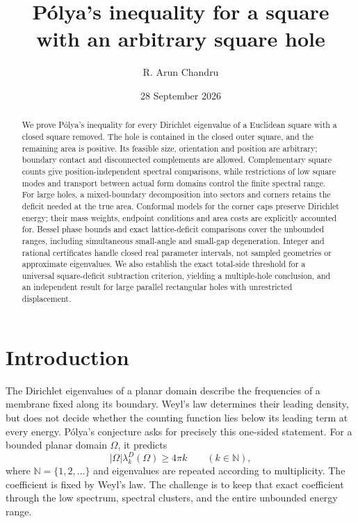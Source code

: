 \documentclass[11pt,reqno]{amsart}
\title[P\'olya's inequality for square holes]{P\'olya's inequality for a square\texorpdfstring{\\}{ }with an arbitrary square hole}
\author{R. Arun Chandru}
\date{28 September 2026}
\numberwithin{equation}{section}
\newcommand{\N}{\mathbb N}
\newcommand{\Om}{\Omega}
\begin{document}
\begin{abstract}
We prove P\'olya's inequality for every Dirichlet eigenvalue of a
Euclidean square with a closed square removed. The hole is contained
in the closed outer square, and the remaining area is positive.
Its feasible size, orientation and position are arbitrary; boundary
contact and disconnected complements are allowed.
Complementary square counts give position-independent spectral
comparisons, while restrictions of low square modes and transport
between actual form domains control the finite spectral range.
For large holes, a mixed-boundary decomposition into sectors and
corners retains the deficit needed at the true area. Conformal
models for the corner caps preserve Dirichlet energy; their mass
weights, endpoint conditions and area costs are explicitly accounted
for. Bessel phase bounds and exact lattice-deficit comparisons cover
the unbounded ranges, including simultaneous small-angle and
small-gap degeneration. Integer and rational certificates handle
closed real parameter intervals, not sampled geometries or approximate
eigenvalues. We also establish the exact total-side threshold for a
universal square-deficit subtraction criterion, yielding a
multiple-hole conclusion, and an independent result for large
parallel rectangular holes with unrestricted displacement.
\end{abstract}
\maketitle
\tableofcontents
\clearpage

\section{Introduction}\label{sec:introduction}

The Dirichlet eigenvalues of a planar domain describe the frequencies
of a membrane fixed along its boundary. Weyl's law determines their
leading density, but does not decide whether the counting function
lies below its leading term at every energy. P\'olya's conjecture asks
for precisely this one-sided statement. For a bounded planar domain
$\Om$, it predicts
\begin{equation}\label{eq:polya}
 |\Om|\lambda_k^D(\Om)\ge4\pi k\qquad(k\in\N),
\end{equation}
where $\N=\{1,2,\ldots\}$ and eigenvalues are repeated according to
multiplicity. The coefficient is fixed by Weyl's law. The challenge is
to keep that exact coefficient through the low spectrum, spectral
clusters, and the entire unbounded energy range.
\end{document}
